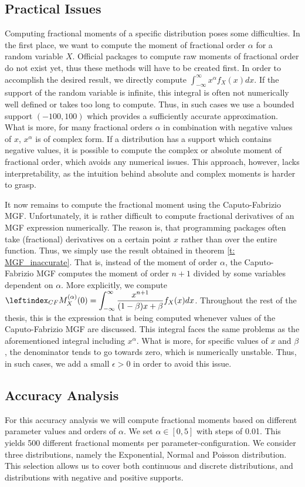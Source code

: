 \subsection{Practical Issues}
Computing fractional moments of a specific distribution poses some difficulties. In the first place, we want to compute the moment of fractional order \(\alpha\) for a random variable \(X\). Official packages to compute raw moments of fractional order do not exist yet, thus these methods will have to be created first. In order to accomplish the desired result, we directly compute \(\int_{-\infty}^{\infty} x^\alpha  f_X(x) dx\). If the support of the random variable is infinite, this integral is often not numerically well defined or takes too long to compute. Thus, in such cases we use a bounded support \((-100, 100)\) which provides a sufficiently accurate approximation. What is more, for many fractional orders \(\alpha\) in combination with negative values of \(x\), \(x^\alpha\) is of complex form. If a distribution has a support which contains negative values, it is possible to compute the complex or absolute moment of fractional order, which avoids any numerical issues. This approach, however, lacks interpretability, as the intuition behind absolute and complex moments is harder to grasp.

It now remains to compute the fractional moment using the Caputo-Fabrizio MGF. Unfortunately, it is rather difficult to compute fractional derivatives of an MGF expression numerically. The reason is, that programming packages often take (fractional) derivatives on a certain point \(x\) rather than over the entire function. Thus, we simply use the result obtained in theorem \ref{t: MGF_inaccurate}. That is, instead of the moment of order \(\alpha\), the Caputo-Fabrizio MGF computes the moment of order \(n+1\) divided by some variables dependent on \(\alpha\). More explicitly, we compute \(\leftindex_{CF}{M}_X^{(\alpha)}(0) = \displaystyle \int_{-\infty}^{\infty}  \frac{x^{n+1} }{(1 - \beta)x + \beta} f_X(x) dx\). Throughout the rest of the thesis, this is the expression that is being computed whenever values of the Caputo-Fabrizio MGF are discussed. This integral faces the same problems as the aforementioned integral including \(x^\alpha\). What is more, for specific values of \(x\) and \(\beta\), the denominator tends to go towards zero, which is numerically unstable. Thus, in such cases, we add a small \(\epsilon > 0\) in order to avoid this issue.

\subsection{Accuracy Analysis}\label{ss:accuracy_analysis}
For this accuracy analysis we will compute fractional moments based on different parameter values and orders of \(\alpha\). We set \(\alpha \in [0, 5]\) with steps of 0.01. This yields 500 different fractional moments per parameter-configuration. We consider three distributions, namely the Exponential, Normal and Poisson distribution. This selection allows us to cover both continuous and discrete distributions, and distributions with negative and positive supports. 

